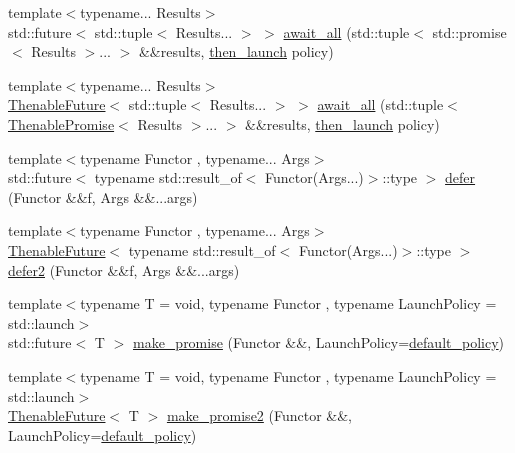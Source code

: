 \begin{DoxyCompactItemize}
\item 
{\footnotesize template$<$typename... Results$>$ }\\std\+::future$<$ std\+::tuple$<$ Results... $>$ $>$ \hyperlink{namespacethenable_a35735af341e005998045c5705c8994d9}{await\+\_\+all} (std\+::tuple$<$ std\+::promise$<$ Results $>$... $>$ \&\&results, \hyperlink{namespacethenable_adf31291b806157ad914943dae5b3c94e}{then\+\_\+launch} policy)
\item 
{\footnotesize template$<$typename... Results$>$ }\\\hyperlink{classthenable_1_1_thenable_future}{Thenable\+Future}$<$ std\+::tuple$<$ Results... $>$ $>$ \hyperlink{namespacethenable_a497fff66463a0580dd10977df3e0549a}{await\+\_\+all} (std\+::tuple$<$ \hyperlink{classthenable_1_1_thenable_promise}{Thenable\+Promise}$<$ Results $>$... $>$ \&\&results, \hyperlink{namespacethenable_adf31291b806157ad914943dae5b3c94e}{then\+\_\+launch} policy)
\item 
{\footnotesize template$<$typename Functor , typename... Args$>$ }\\std\+::future$<$ typename std\+::result\+\_\+of$<$ Functor(Args...)$>$\+::type $>$ \hyperlink{namespacethenable_aceaaf1439cfecf2aab95b6632aadf579}{defer} (Functor \&\&f, Args \&\&...args)
\item 
{\footnotesize template$<$typename Functor , typename... Args$>$ }\\\hyperlink{classthenable_1_1_thenable_future}{Thenable\+Future}$<$ typename std\+::result\+\_\+of$<$ Functor(Args...)$>$\+::type $>$ \hyperlink{namespacethenable_ad9ad041b2e810ef9b1325657a68a48d7}{defer2} (Functor \&\&f, Args \&\&...args)
\item 
{\footnotesize template$<$typename T  = void, typename Functor , typename Launch\+Policy  = std\+::launch$>$ }\\std\+::future$<$ T $>$ \hyperlink{namespacethenable_af2607b8a2775a7d983793a497aad3904}{make\+\_\+promise} (Functor \&\&, Launch\+Policy=\hyperlink{namespacethenable_a55a20a452e9ba9c0eff946d9b8636f06}{default\+\_\+policy})
\item 
{\footnotesize template$<$typename T  = void, typename Functor , typename Launch\+Policy  = std\+::launch$>$ }\\\hyperlink{classthenable_1_1_thenable_future}{Thenable\+Future}$<$ T $>$ \hyperlink{namespacethenable_a48b432e0694e822676fac2de12263a43}{make\+\_\+promise2} (Functor \&\&, Launch\+Policy=\hyperlink{namespacethenable_a55a20a452e9ba9c0eff946d9b8636f06}{default\+\_\+policy})
\item 

\end{DoxyCompactItemize}
